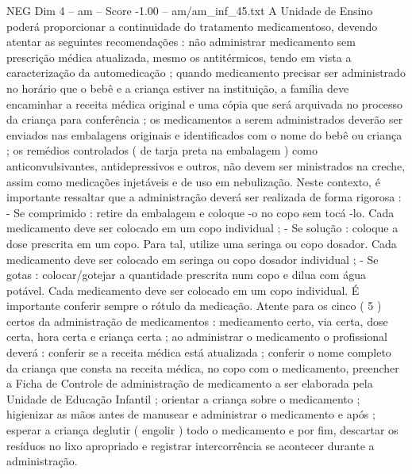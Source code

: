 \begin{textsample}{NEG Dim 4 – am – Score -1.00 – am/am\_inf\_45.txt}
A Unidade de Ensino poderá proporcionar a continuidade do tratamento medicamentoso, devendo atentar as seguintes recomendações : não administrar medicamento sem prescrição médica atualizada, mesmo os antitérmicos, tendo em vista a caracterização da automedicação ; quando medicamento precisar ser administrado no horário que o bebê e a criança estiver na instituição, a família deve encaminhar a receita médica original e uma cópia que será arquivada no processo da criança para conferência ; os medicamentos a serem administrados deverão ser enviados nas embalagens originais e identificados com o nome do bebê ou criança ; os remédios controlados ( de tarja preta na embalagem ) como anticonvulsivantes, antidepressivos e outros, não devem ser ministrados na creche, assim como medicações injetáveis e de uso em nebulização.
Neste contexto, é importante ressaltar que a administração deverá ser realizada de forma rigorosa : - Se comprimido : retire da embalagem e coloque -o no copo sem tocá -lo.
Cada medicamento deve ser colocado em um copo individual ; - Se solução : coloque a dose prescrita em um copo.
Para tal, utilize uma seringa ou copo dosador.
Cada medicamento deve ser colocado em seringa ou copo dosador individual ; - Se gotas : colocar/gotejar a quantidade prescrita num copo e dilua com água potável.
Cada medicamento deve ser colocado em um copo individual.
É importante conferir sempre o rótulo da medicação.
Atente para os cinco ( 5 ) certos da administração de medicamentos : medicamento certo, via certa, dose certa, hora certa e criança certa ; ao administrar o medicamento o profissional deverá : conferir se a receita médica está atualizada ; conferir o nome completo da criança que consta na receita médica, no copo com o medicamento, preencher a Ficha de Controle de administração de medicamento a ser elaborada pela Unidade de Educação Infantil ; orientar a criança sobre o medicamento ; higienizar as mãos antes de manusear e administrar o medicamento e após ; esperar a criança deglutir ( engolir ) todo o medicamento e por fim, descartar os resíduos no lixo apropriado e registrar intercorrência se acontecer durante a administração.

\end{textsample}
